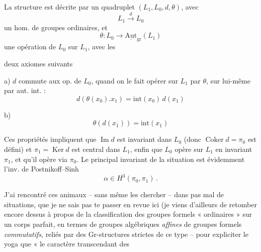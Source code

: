 \documentclass[11pt,a4paper]{article}
\begin{document}
La structure est décrite par un quadruplet $(L_1, L_0, d, \theta)$, avec
\[
L_1 \xrightarrow{\;d\;} L_0
\]
un hom. de groupes ordinaires, et
\[
\theta\colon L_0 \longrightarrow \underline{\mathrm{Aut}}_{\mathrm{gr}}(L_1)
\]
une opération de $L_0$ \struck{\ill{}} sur $L_1$, avec les

deux axiomes suivants

a) $d$ commute aux op. de $L_0$, quand on le fait opérer sur $L_1$ par $\theta$, sur lui-même par aut. int. :
\[
d(\theta(x_0).x_1) = \mathrm{int}(x_0)\, d(x_1)
\]

b) \[
\theta(d(x_1)) = \mathrm{int}(x_1)
\]

Ces propriétés impliquent que $\operatorname{Im} d$ est invariant dans $L_0$ (donc $\operatorname{Coker} d = \pi_0$ est défini) et $\pi_1 = \operatorname{Ker} d$ est central dans $L_1$, enfin que $L_0$ opère sur $L_1$ en invariant $\pi_1$, et qu'il opère via $\pi_0$. Le principal invariant  de la situation est évidemment l'inv. de Postnikoff--Sinh
\[
\alpha \in H^3(\pi_0, \pi_1) \,.
\]

J'ai rencontré ces animaux -- sans même les chercher -- dans pas mal de situations, que je ne sais pas te passer en revue ici (je viens d'ailleurs de retomber encore dessus à propos de la classification des groupes formels « ordinaires » sur un corps parfait, en termes de groupes algébriques \emph{affines} de groupes formels \emph{commutatifs}, reliés par des Gr-structures strictes de ce type -- pour expliciter le yoga que « le caractère transcendant des
\marginal{[le formalisme sur un topos quelconque (pas seulement dans (Ens))}
\end{document}
